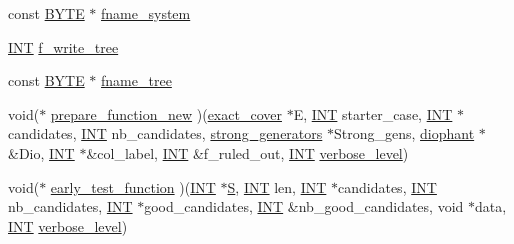 \begin{DoxyCompactItemize}
const \mbox{\hyperlink{galois_8h_ab6cc7b4aeb6ea31aba2b3fbfc83ff5e6}{B\+Y\+TE}} $\ast$ \mbox{\hyperlink{classexact__cover__arguments_a9b6b20a411af6aa0587660585d5c26f6}{fname\+\_\+system}}
\item 
\mbox{\hyperlink{galois_8h_a09fddde158a3a20bd2dcadb609de11dc}{I\+NT}} \mbox{\hyperlink{classexact__cover__arguments_a7cbfe35eaba572f79cb477625f74f53e}{f\+\_\+write\+\_\+tree}}
\item 
const \mbox{\hyperlink{galois_8h_ab6cc7b4aeb6ea31aba2b3fbfc83ff5e6}{B\+Y\+TE}} $\ast$ \mbox{\hyperlink{classexact__cover__arguments_a83723e1f6ff96f5e831a2eb41a46878e}{fname\+\_\+tree}}
\item 
void($\ast$ \mbox{\hyperlink{classexact__cover__arguments_a30036df66f5fb27c41d2507689157587}{prepare\+\_\+function\+\_\+new}} )(\mbox{\hyperlink{classexact__cover}{exact\+\_\+cover}} $\ast$E, \mbox{\hyperlink{galois_8h_a09fddde158a3a20bd2dcadb609de11dc}{I\+NT}} starter\+\_\+case, \mbox{\hyperlink{galois_8h_a09fddde158a3a20bd2dcadb609de11dc}{I\+NT}} $\ast$candidates, \mbox{\hyperlink{galois_8h_a09fddde158a3a20bd2dcadb609de11dc}{I\+NT}} nb\+\_\+candidates, \mbox{\hyperlink{classstrong__generators}{strong\+\_\+generators}} $\ast$Strong\+\_\+gens, \mbox{\hyperlink{classdiophant}{diophant}} $\ast$\&Dio, \mbox{\hyperlink{galois_8h_a09fddde158a3a20bd2dcadb609de11dc}{I\+NT}} $\ast$\&col\+\_\+label, \mbox{\hyperlink{galois_8h_a09fddde158a3a20bd2dcadb609de11dc}{I\+NT}} \&f\+\_\+ruled\+\_\+out, \mbox{\hyperlink{galois_8h_a09fddde158a3a20bd2dcadb609de11dc}{I\+NT}} \mbox{\hyperlink{simeon_8_c_a818073fbcc2f439e7c56952f67386122}{verbose\+\_\+level}})
\item 
void($\ast$ \mbox{\hyperlink{classexact__cover__arguments_a7f47cf84f9bed9d140695f1c94e3099a}{early\+\_\+test\+\_\+function}} )(\mbox{\hyperlink{galois_8h_a09fddde158a3a20bd2dcadb609de11dc}{I\+NT}} $\ast$\mbox{\hyperlink{simeon_8_c_adab47f8243f1b5a2c31df2535d6b37d0}{S}}, \mbox{\hyperlink{galois_8h_a09fddde158a3a20bd2dcadb609de11dc}{I\+NT}} len, \mbox{\hyperlink{galois_8h_a09fddde158a3a20bd2dcadb609de11dc}{I\+NT}} $\ast$candidates, \mbox{\hyperlink{galois_8h_a09fddde158a3a20bd2dcadb609de11dc}{I\+NT}} nb\+\_\+candidates, \mbox{\hyperlink{galois_8h_a09fddde158a3a20bd2dcadb609de11dc}{I\+NT}} $\ast$good\+\_\+candidates, \mbox{\hyperlink{galois_8h_a09fddde158a3a20bd2dcadb609de11dc}{I\+NT}} \&nb\+\_\+good\+\_\+candidates, void $\ast$data, \mbox{\hyperlink{galois_8h_a09fddde158a3a20bd2dcadb609de11dc}{I\+NT}} \mbox{\hyperlink{simeon_8_c_a818073fbcc2f439e7c56952f67386122}{verbose\+\_\+level}})
\item 

\end{DoxyCompactItemize}
